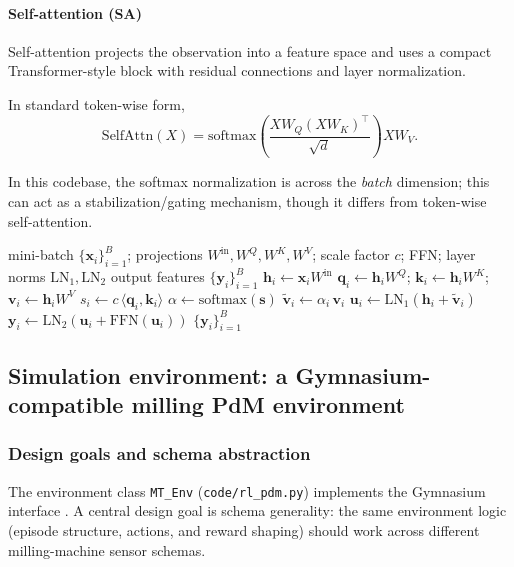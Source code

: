 \documentclass[sn-basic]{sn-jnl} %
\begin{document}
\paragraph{Self-attention (SA)}
Self-attention projects the observation into a feature space and uses a compact Transformer-style block with residual connections and layer normalization.

In standard token-wise form,
\begin{equation}
\mathrm{SelfAttn}(X)=\mathrm{softmax}\left(\frac{XW_Q(XW_K)^\top}{\sqrt{d}}\right)XW_V.
\end{equation}

In this codebase, the softmax normalization is across the \emph{batch} dimension; this can act as a stabilization/gating mechanism, though it differs from token-wise self-attention.

\begin{algorithm}[t]
\caption{Self-attention feature extractor (forward pass; batch-normalized gating)}
\label{alg:sa_forward}
\begin{algorithmic}[1]
\Require mini-batch $\{\mathbf{x}_i\}_{i=1}^{B}$; projections $W^{\mathrm{in}},W^Q,W^K,W^V$; scale factor $c$; FFN; layer norms $\mathrm{LN}_1,\mathrm{LN}_2$
\Ensure output features $\{\mathbf{y}_i\}_{i=1}^{B}$
        \State $\mathbf{h}_i \gets \mathbf{x}_i W^{\mathrm{in}}$
        \State $\mathbf{q}_i \gets \mathbf{h}_i W^Q$; $\mathbf{k}_i \gets \mathbf{h}_i W^K$; $\mathbf{v}_i \gets \mathbf{h}_i W^V$
        \State $s_i \gets c\,\langle \mathbf{q}_i,\mathbf{k}_i\rangle$ 
\EndFor
\State $\alpha \gets \mathrm{softmax}(\mathbf{s})$ 
        \State $\tilde{\mathbf{v}}_i \gets \alpha_i\,\mathbf{v}_i$
        \State $\mathbf{u}_i \gets \mathrm{LN}_1(\mathbf{h}_i + \tilde{\mathbf{v}}_i)$
        \State $\mathbf{y}_i \gets \mathrm{LN}_2(\mathbf{u}_i + \mathrm{FFN}(\mathbf{u}_i))$
\EndFor
\State \Return $\{\mathbf{y}_i\}_{i=1}^{B}$
\end{algorithmic}
\end{algorithm}

\subsection{Simulation environment: a Gymnasium-compatible milling PdM environment}
\label{sec:env}
\subsubsection{Design goals and schema abstraction}
The environment class \texttt{MT\_Env} (\texttt{code/rl\_pdm.py}) implements the Gymnasium interface \cite{Foundation2023}. A central design goal is schema generality: the same environment logic (episode structure, actions, and reward shaping) should work across different milling-machine sensor schemas.
\end{document}
